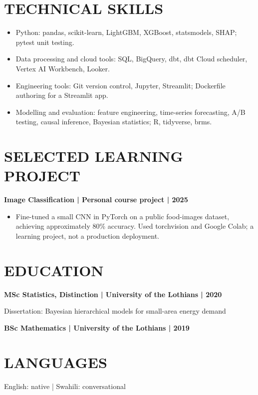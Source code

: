 \documentclass[11pt,a4paper]{article}
\newcommand{\cvsection}[1]{\section*{#1}}
\begin{document}
\cvsection{TECHNICAL SKILLS}
\begin{itemize}
\item Python: pandas, scikit-learn, LightGBM, XGBoost, statsmodels, SHAP; pytest unit testing.
\item Data processing and cloud tools: SQL, BigQuery, dbt, dbt Cloud scheduler, Vertex AI Workbench, Looker.
\item Engineering tools: Git version control, Jupyter, Streamlit; Dockerfile authoring for a Streamlit app.
\item Modelling and evaluation: feature engineering, time-series forecasting, A/B testing, causal inference, Bayesian statistics; R, tidyverse, brms.
\end{itemize}

\cvsection{SELECTED LEARNING PROJECT}
\textbf{Image Classification | Personal course project | 2025}
\begin{itemize}
\item Fine-tuned a small CNN in PyTorch on a public food-images dataset, achieving approximately 80\% accuracy. Used torchvision and Google Colab; a learning project, not a production deployment.
\end{itemize}

\cvsection{EDUCATION}
\textbf{MSc Statistics, Distinction | University of the Lothians | 2020}\par
Dissertation: Bayesian hierarchical models for small-area energy demand\par
\vspace{0.4em}
\textbf{BSc Mathematics | University of the Lothians | 2019}

\cvsection{LANGUAGES}
English: native | Swahili: conversational
\end{document}
